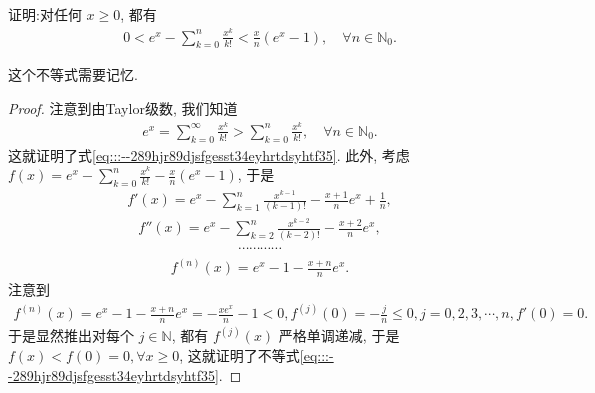 \documentclass[../../main.tex]{subfiles}%
\begin{document}
\begin{proposition}\label{proposition:e^x的幂级数展开的放缩不等式}
证明:对任何 $x \geqslant 0$, 都有
\begin{align}
0 < e^x - \sum_{k=0}^n \frac{x^k}{k!} < \frac{x}{n}\left(e^x - 1\right), \quad \forall n \in \mathbb{N}_0. \label{eq:::--289hjr89djsfgesst34eyhrtdsyhtf35}
\end{align}
\end{proposition}
\begin{note}
这个不等式需要记忆.
\end{note}
\begin{proof}

注意到由Taylor级数, 我们知道
\begin{align*}
e^x = \sum_{k=0}^{\infty} \frac{x^k}{k!} > \sum_{k=0}^n \frac{x^k}{k!}, \quad \forall n \in \mathbb{N}_0.
\end{align*}
这就证明了式\eqref{eq:::--289hjr89djsfgesst34eyhrtdsyhtf35}. 此外, 考虑 $f(x) = e^x - \sum_{k=0}^n \frac{x^k}{k!} - \frac{x}{n}\left(e^x - 1\right)$, 于是
\begin{align*}
f'(x) = e^x - \sum_{k=1}^n \frac{x^{k-1}}{(k-1)!} - \frac{x+1}{n}e^x + \frac{1}{n},
\end{align*}
\begin{align*}
f''(x) = e^x - \sum_{k=2}^n \frac{x^{k-2}}{(k-2)!} - \frac{x+2}{n}e^x,
\end{align*}
\begin{align*}
\cdots \cdots \cdots \cdots 
\end{align*}
\begin{align*}
f^{(n)}(x) = e^x - 1 - \frac{x+n}{n}e^x.
\end{align*}
注意到
\begin{align*}
f^{(n)}(x) = e^x - 1 - \frac{x+n}{n}e^x = -\frac{xe^x}{n} - 1 < 0, f^{(j)}(0) = -\frac{j}{n} \leqslant 0, j=0,2,3,\cdots,n, f'(0)=0.
\end{align*}
于是显然推出对每个 $j \in \mathbb{N}$, 都有 $f^{(j)}(x)$ 严格单调递减, 于是 $f(x) < f(0)=0, \forall x \geqslant 0$, 这就证明了不等式\eqref{eq:::--289hjr89djsfgesst34eyhrtdsyhtf35}.

\end{proof}
\end{document}
